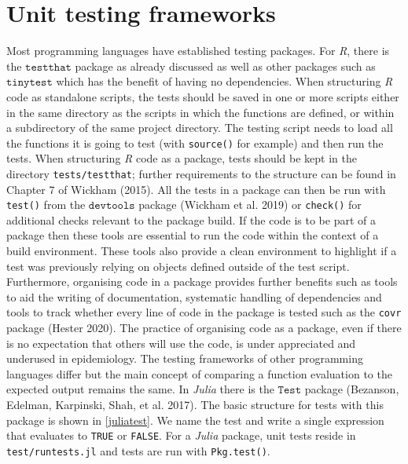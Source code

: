 \documentclass[]{elsarticle} %
\begin{document}
\hypertarget{frameworks}{%
\section{Unit testing frameworks}\label{frameworks}}

Most programming languages have established testing packages.
For \emph{R}, there is the \(\texttt{testthat}\) package as already discussed as well as other packages such as \(\texttt{tinytest}\) which has the benefit of having no dependencies.
When structuring \emph{R} code as standalone scripts, the tests should be saved in one or more scripts either in the same directory as the scripts in which the functions are defined, or within a subdirectory of the same project directory.
The testing script needs to load all the functions it is going to test (with \texttt{source()} for example) and then run the tests.
When structuring \emph{R} code as a package, tests should be kept in the directory \texttt{tests/testthat}; further requirements to the structure can be found in Chapter 7 of Wickham (2015).
All the tests in a package can then be run with \texttt{test()} from the \(\texttt{devtools}\) package (Wickham et al. 2019) or \texttt{check()} for additional checks relevant to the package build.
If the code is to be part of a package then these tools are essential to run the code within the context of a build environment.
These tools also provide a clean environment to highlight if a test was previously relying on objects defined outside of the test script.
Furthermore, organising code in a package provides further benefits such as tools to aid the writing of documentation, systematic handling of dependencies and tools to track whether every line of code in the package is tested such as the \texttt{covr} package (Hester 2020).
The practice of organising code as a package, even if there is no expectation that others will use the code, is under appreciated and underused in epidemiology.
\newline
\newline
The testing frameworks of other programming languages differ but the main concept of comparing a function evaluation to the expected output remains the same.
In \emph{Julia} there is the \(\texttt{Test}\) package (Bezanson, Edelman, Karpinski, Shah, et al. 2017).
The basic structure for tests with this package is shown in \ref{juliatest}.
We name the test and write a single expression that evaluates to \texttt{TRUE} or \texttt{FALSE}.
For a \emph{Julia} package, unit tests reside in \texttt{test/runtests.jl} and tests are run with \texttt{Pkg.test()}.
\newline
{}\label{juliatest}
\end{document}

